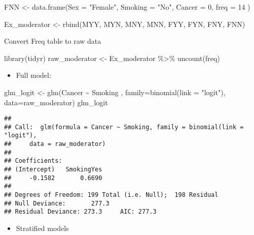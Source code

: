 \documentclass[
]{book}
\newenvironment{Shaded}{\begin{snugshade}}{\end{snugshade}}
\newcommand{\AttributeTok}[1]{\textcolor[rgb]{0.77,0.63,0.00}{#1}}
\newcommand{\DecValTok}[1]{\textcolor[rgb]{0.00,0.00,0.81}{#1}}
\newcommand{\FunctionTok}[1]{\textcolor[rgb]{0.00,0.00,0.00}{#1}}
\newcommand{\NormalTok}[1]{#1}
\newcommand{\OtherTok}[1]{\textcolor[rgb]{0.56,0.35,0.01}{#1}}
\newcommand{\SpecialCharTok}[1]{\textcolor[rgb]{0.00,0.00,0.00}{#1}}
\newcommand{\StringTok}[1]{\textcolor[rgb]{0.31,0.60,0.02}{#1}}
\providecommand{\tightlist}{%
  \setlength{\itemsep}{0pt}\setlength{\parskip}{0pt}}
\begin{document}
\begin{Shaded}
\begin{Highlighting}[]
\NormalTok{FNN }\OtherTok{\textless{}{-}} \FunctionTok{data.frame}\NormalTok{(}\AttributeTok{Sex =} \StringTok{"Female"}\NormalTok{,}
                  \AttributeTok{Smoking =} \StringTok{"No"}\NormalTok{,}
                  \AttributeTok{Cancer =} \DecValTok{0}\NormalTok{,}
                  \AttributeTok{freq =} \DecValTok{14}
\NormalTok{                  )}

\NormalTok{Ex\_moderator }\OtherTok{\textless{}{-}} \FunctionTok{rbind}\NormalTok{(MYY, MYN, MNY, MNN, FYY, FYN, FNY, FNN)}
\end{Highlighting}
\end{Shaded}

Convert Freq table to raw data

\begin{Shaded}
\begin{Highlighting}[]
\FunctionTok{library}\NormalTok{(tidyr)}
\NormalTok{raw\_moderator }\OtherTok{\textless{}{-}}\NormalTok{ Ex\_moderator }\SpecialCharTok{\%\textgreater{}\%} 
  \FunctionTok{uncount}\NormalTok{(freq)}
\end{Highlighting}
\end{Shaded}

\begin{itemize}
\tightlist
\item
  Full model:
\end{itemize}

\begin{Shaded}
\begin{Highlighting}[]
\NormalTok{glm\_logit }\OtherTok{\textless{}{-}} \FunctionTok{glm}\NormalTok{(Cancer }\SpecialCharTok{\textasciitilde{}}\NormalTok{ Smoking , }\AttributeTok{family=}\FunctionTok{binomial}\NormalTok{(}\AttributeTok{link =} \StringTok{"logit"}\NormalTok{), }\AttributeTok{data=}\NormalTok{raw\_moderator)}
\NormalTok{glm\_logit}
\end{Highlighting}
\end{Shaded}

\begin{verbatim}
## 
## Call:  glm(formula = Cancer ~ Smoking, family = binomial(link = "logit"), 
##     data = raw_moderator)
## 
## Coefficients:
## (Intercept)   SmokingYes  
##     -0.1582       0.6690  
## 
## Degrees of Freedom: 199 Total (i.e. Null);  198 Residual
## Null Deviance:       277.3 
## Residual Deviance: 273.3     AIC: 277.3
\end{verbatim}

\begin{itemize}
\tightlist
\item
  Stratified models
\end{itemize}
\end{document}
